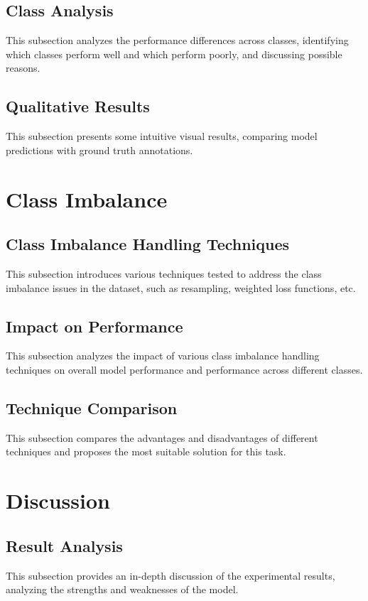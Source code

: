 \documentclass[conference]{IEEEtran}
\begin{document}
\subsection{Class Analysis}
This subsection analyzes the performance differences across classes, identifying which classes perform well and which perform poorly, and discussing possible reasons.

\subsection{Qualitative Results}
This subsection presents some intuitive visual results, comparing model predictions with ground truth annotations.

\section{Class Imbalance}
\subsection{Class Imbalance Handling Techniques}
This subsection introduces various techniques tested to address the class imbalance issues in the dataset, such as resampling, weighted loss functions, etc.

\subsection{Impact on Performance}
This subsection analyzes the impact of various class imbalance handling techniques on overall model performance and performance across different classes.

\subsection{Technique Comparison}
This subsection compares the advantages and disadvantages of different techniques and proposes the most suitable solution for this task.

\section{Discussion}
\subsection{Result Analysis}
This subsection provides an in-depth discussion of the experimental results, analyzing the strengths and weaknesses of the model.
\end{document}

